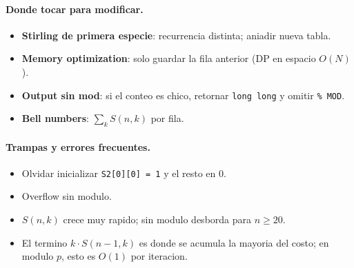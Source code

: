 \paragraph{Donde tocar para modificar.}
\begin{itemize}\setlength\itemsep{0pt}
	\item \textbf{Stirling de primera especie}: recurrencia distinta; aniadir nueva tabla.
	\item \textbf{Memory optimization}: solo guardar la fila anterior (DP en espacio $O(N)$).
	\item \textbf{Output sin mod}: si el conteo es chico, retornar \texttt{long long} y omitir \texttt{\% MOD}.
	\item \textbf{Bell numbers}: $\sum_k S(n, k)$ por fila.
\end{itemize}

\paragraph{Trampas y errores frecuentes.}
\begin{itemize}\setlength\itemsep{0pt}
	\item Olvidar inicializar \texttt{S2[0][0] = 1} y el resto en 0.
	\item Overflow sin modulo.
	\item $S(n, k)$ crece muy rapido; sin modulo desborda para $n \ge 20$.
	\item El termino $k \cdot S(n-1, k)$ es donde se acumula la mayoria del costo; en modulo $p$, esto es $O(1)$ por iteracion.
\end{itemize}

